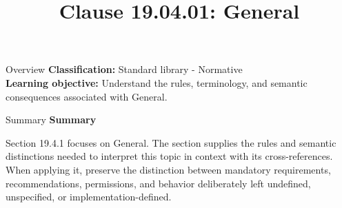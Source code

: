 \documentclass[10pt,letterpaper]{article}
\title{Clause 19.04.01: General}
\author{}
\date{}
\begin{document}
\maketitle
\begin{CornellOverviewBox}{Overview}
\textbf{Classification:} Standard library - Normative\\[2pt]
\textbf{Learning objective:} Understand the rules, terminology, and semantic consequences associated with General.
\end{CornellOverviewBox}\begin{CornellSummaryBox}{Summary}
{\sffamily\bfseries\color{Accent} Summary}\par\vspace{3pt}Section 19.4.1 focuses on General. The section supplies the rules and semantic distinctions needed to interpret this topic in context with its cross-references. When applying it, preserve the distinction between mandatory requirements, recommendations, permissions, and behavior deliberately left undefined, unspecified, or implementation-defined.
\end{CornellSummaryBox}
\end{document}
